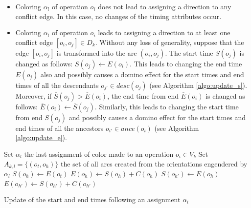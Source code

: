 \begin{itemize}
\item Coloring $\alpha_l$ of operation $o_i$ does not lead to assigning a direction to any conflict edge. In this case, no changes of the timing attributes occur.
\item Coloring $\alpha_l$ of operation $o_i$ leads to assigning a direction to at least one conflict edge $[o_i,o_j] \in D_k$. Without any loss of generality, suppose that the edge $[o_i,o_j]$ is transformed into the arc $(o_i,o_j)$. The start time $S(o_j)$ is changed as follows: $S(o_j) \leftarrow E(o_i)$. This leads to changing the end time $E(o_j)$ also and possibly causes a domino effect for the start times and end times of all the descendants $o_{j'} \in desc(o_j)$ (see Algorithm \ref{algo:update_s}). Moreover, if $\overline{S}(o_j) > \overline{E}(o_i)$, the end time from end $\overline{E}(o_i)$ is changed as follows: $\overline{E}(o_i) \leftarrow \overline{S}(o_j)$. Similarly, this leads to changing the start time from end $\overline{S}(o_j)$ and possibly causes a domino effect for the start times and end times of all the ancestors $o_{i'} \in ance(o_i)$ (see Algorithm \ref{algo:update_e}).
\end{itemize}

\begin{algorithm}[htb]
	Set $\alpha_l$ the last assignment of color made to an operation $o_i \in V_k$\;
	Set $A_{k,l} = \{(o_t,o_h)\}$ the set of all arcs created from the orientations engendered by $\alpha_l$\;
		{
				{
					$S(o_h) \leftarrow E(o_t)$\;
					$E(o_h) \leftarrow S(o_h) + C(o_h)$\;
					\;
				}
		}
		{
			{
						{
							{
								$S(o_{h'}) \leftarrow E(o_h)$\;
								$E(o_{h'}) \leftarrow S(o_{h'}) + C(o_{h'})$\;
								\;
							}
						}
			}
			 \KwRet\;
		}
	\caption{Update of the start and end times following an assignment $\alpha_l$}
	\label{algo:update_s}
\end{algorithm}


